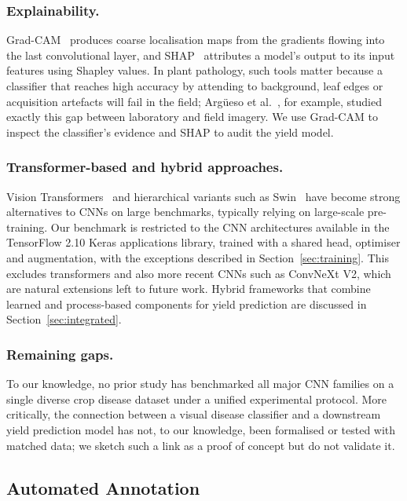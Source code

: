 \subsubsection*{Explainability.}
Grad-CAM~\cite{selvaraju2017} produces coarse localisation maps from
the gradients flowing into the last convolutional layer, and SHAP~\cite{lundberg2017}
attributes a model's output to its input features using Shapley
values. In plant pathology, such tools matter because a classifier
that reaches high accuracy by attending to background, leaf edges or
acquisition artefacts will fail in the field; Argüeso et
al.~\cite{arguesoa2020}, for example, studied exactly this gap between
laboratory and field imagery. We use Grad-CAM to inspect the
classifier's evidence and SHAP to audit the yield model.

\subsubsection*{Transformer-based and hybrid approaches.}
Vision Transformers~\cite{dosovitskiy2021} and hierarchical variants
such as Swin~\cite{liu2021swin} have become strong alternatives to
CNNs on large benchmarks, typically relying on large-scale
pre-training. Our benchmark is restricted to the CNN architectures available in the
TensorFlow 2.10 Keras applications library, trained with a shared head,
optimiser and augmentation, with the exceptions described in
Section~\ref{sec:training}. This excludes transformers and also more recent
CNNs such as ConvNeXt V2, which are natural extensions left to future work. Hybrid frameworks
that combine learned and process-based components for yield
prediction are discussed in Section~\ref{sec:integrated}.

\subsubsection*{Remaining gaps.}
To our knowledge, no prior study has benchmarked all major CNN
families on a single diverse crop disease dataset under a unified
experimental protocol.
More critically, the connection between a visual disease classifier
and a downstream yield prediction model has not, to our knowledge, been
formalised or tested with matched data; we sketch such a link as a
proof of concept but do not validate it.

\subsection{Automated Annotation}

